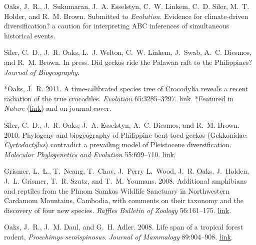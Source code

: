 \documentclass[10pt]{article}
\begin{document}
%
\begin{thebibliography}{6}
\providecommand{\natexlab}[1]{#1}
\providecommand{\url}[1]{\texttt{#1}}
\providecommand{\urlprefix}{URL }

Oaks, J.~R., J.~Sukumaran, J.~A. Esselstyn, C.~W. Linkem, C.~D. Siler, M.~T.
  Holder, and R.~M. Brown. Submitted to \emph{Evolution}.
\newblock Evidence for climate-driven diversification? a caution for
  interpreting {ABC} inferences of simultaneous historical events.

Siler, C.~D., J.~R. Oaks, L.~J. Welton, C.~W. Linkem, J.~Swab, A.~C. Diesmos,
  and R.~M. Brown. In press.
\newblock Did geckos ride the {P}alawan raft to the {P}hilippines?
\newblock \emph{Journal of Biogeography}.

*Oaks, J.~R. 2011.
\newblock A time-calibrated species tree of {C}rocodylia reveals a recent
  radiation of the true crocodiles.
\newblock \emph{Evolution} 65:3285--3297.
\newblock
  \href{http://onlinelibrary.wiley.com/doi/10.1111/j.1558-5646.2011.01373.x/abstract}{link}.
  *Featured in \emph{Nature} (\href{http://www.nature.com/nature/journal/v474/n7353/full/474545a.html}{link}) and on journal cover.

Siler, C.~D., J.~R. Oaks, J.~A. Esselstyn, A.~C. Diesmos, and R.~M. Brown.
  2010.
\newblock Phylogeny and biogeography of {P}hilippine bent-toed geckos
  ({G}ekkonidae: \emph{{C}yrtodactylus}) contradict a prevailing model of
  {P}leistocene diversification.
\newblock \emph{Molecular Phylogenetics and Evolution} 55:699--710.
\newblock
  \href{http://www.sciencedirect.com/science/article/pii/S1055790310000382}{link}.

Grismer, L.~L., T.~Neang, T.~Chav, J.~Perry L.~Wood, J.~R. Oaks, J.~Holden,
  J.~L. Grismer, T.~R. Szutz, and T.~M. Youmans. 2008.
\newblock Additional amphibians and reptiles from the {P}hnom {S}amkos
  {W}ildlife {S}anctuary in {N}orthwestern {C}ardamom {M}ountains, {C}ambodia,
  with comments on their taxonomy and the discovery of four new species.
\newblock \emph{Raffles Bulletin of Zoology} 56:161--175.
\newblock
  \href{http://rmbr.nus.edu.sg/rbz/biblio/56/56rbz161-175.pdf}{link}.

Oaks, J.~R., J.~M. Daul, and G.~H. Adler. 2008.
\newblock Life span of a tropical forest rodent, \emph{{P}roechimys
  semispinosus}.
\newblock \emph{Journal of Mammalogy} 89:904--908.
\newblock \href{http://dx.doi.org/10.1644/07-MAMM-A-045.1}{link}.

\end{thebibliography}
\end{document}
